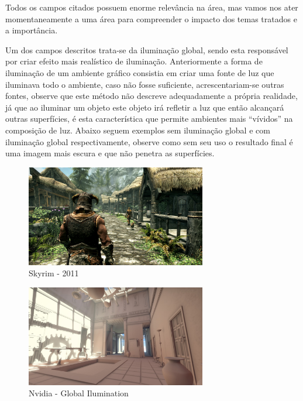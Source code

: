Todos os campos citados possuem enorme relevância na área, mas vamos nos ater momentaneamente a uma área para compreender o impacto dos temas tratados e a importância.

Um dos campos descritos trata-se da iluminação global, sendo esta responsável por criar efeito mais realístico de iluminação. Anteriormente a forma de iluminação de um ambiente gráfico consistia em criar uma fonte de luz que iluminava todo o ambiente, caso não fosse suficiente, acrescentariam-se outras fontes, observe que este método não descreve adequadamente a própria realidade, já que ao iluminar um objeto este objeto irá refletir a luz que então alcançará outras superfícies, é esta característica que permite ambientes mais “vívidos” na composição de luz. Abaixo seguem exemplos sem iluminação global e com iluminação global respectivamente, observe como sem seu uso o resultado final é uma imagem mais escura e que não penetra as superfícies.

\begin{figure}[H]
    \centering
    \includegraphics[width=0.7\textwidth]{experiments/uventura/AnaliseBibliometrica/Images/skyrim-remaster.jpg}
    \caption{Skyrim - 2011}
    \label{fig:uventura:bib-skyrim}
\end{figure}

\begin{figure}[H]
    \centering
    \includegraphics[width=0.7\textwidth]{experiments/uventura/AnaliseBibliometrica/Images/global-ilumination.jpg}
    \caption{Nvidia - Global Ilumination}
    \label{fig:uventura:bib-nvidia-global-ilumn}
\end{figure}

